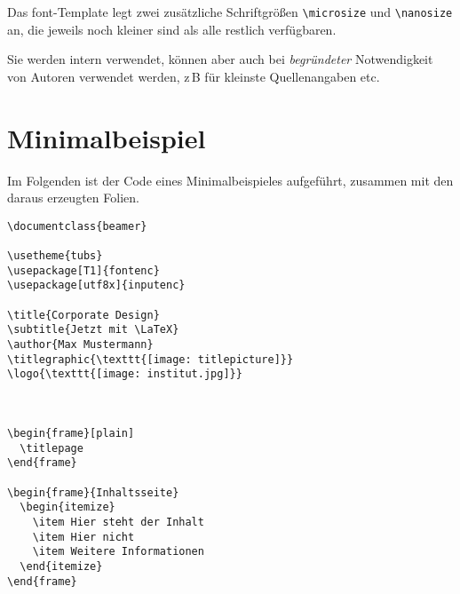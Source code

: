 Das font-Template legt zwei zusätzliche Schriftgrößen \lstinline{\microsize}
und \lstinline{\nanosize} an, die jeweils noch kleiner sind als alle restlich
verfügbaren.

Sie werden intern verwendet, können aber auch bei \emph{begründeter}
Notwendigkeit von Autoren verwendet werden, z\,B für kleinste Quellenangaben
etc.


\section{Minimalbeispiel}%

Im Folgenden ist der Code eines Minimalbeispieles aufgeführt, zusammen mit den
daraus erzeugten Folien.

\begin{verbatim}
\documentclass{beamer}

\usetheme{tubs}
\usepackage[T1]{fontenc}
\usepackage[utf8x]{inputenc}

\title{Corporate Design}
\subtitle{Jetzt mit \LaTeX}
\author{Max Mustermann}
\titlegraphic{\texttt{[image: titlepicture]}}
\logo{\texttt{[image: institut.jpg]}}



\begin{frame}[plain]
  \titlepage
\end{frame}

\begin{frame}{Inhaltsseite}
  \begin{itemize}
    \item Hier steht der Inhalt
    \item Hier nicht
    \item Weitere Informationen
  \end{itemize}
\end{frame}


\end{verbatim}

\begin{center}

\end{center}
